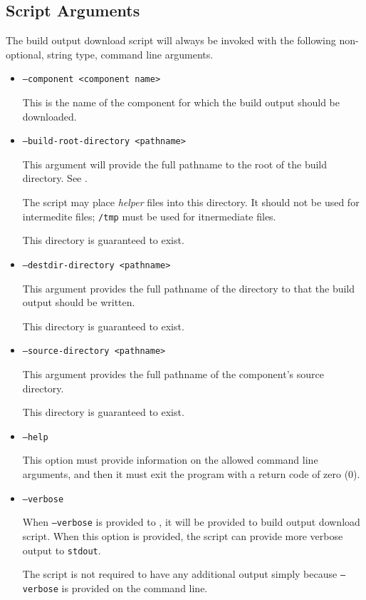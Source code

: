 \subsection{Script Arguments}

The build output download script will always be invoked with the
following non-optional, string type, command line arguments.

\begin{itemize}
\item{\texttt{--component <component name>}}

  This is the name of the component for which the build output should
  be downloaded.

\item{\texttt{--build-root-directory <pathname>}}

  This argument will provide the full pathname to the root of the
  build directory.  See .

  The script may place \emph{helper} files into this directory.  It
  should not be used for intermedite files; \texttt{/tmp} must be used
  for itnermediate files.

  This directory is guaranteed to exist.

\item{\texttt{--destdir-directory <pathname>}}

  This argument provides the full pathname of the directory to that
  the build output should be written.

  This directory is guaranteed to exist.

\item{\texttt{--source-directory <pathname>}}

  This argument provides the full pathname of the component's source
  directory.

  This directory is guaranteed to exist.

\item{\texttt{--help}}

  This option must provide information on the allowed command line
  arguments, and then it must exit the program with a return code of
  zero (0).

\item{\texttt{--verbose}}

  When \texttt{--verbose} is provided to \lmsbwcmd, it will be
  provided to build output download script.  When this option is
  provided, the script can provide more verbose output to
  \texttt{stdout}.

  The script is not required to have any additional output simply
  because \texttt{--verbose} is provided on the command line.
\end{itemize}

